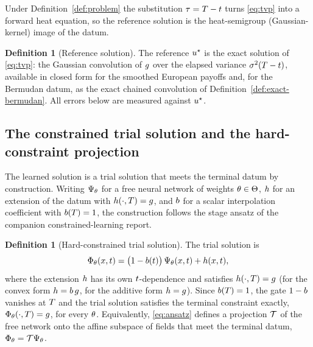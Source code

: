 \documentclass[11pt]{article}
\theoremstyle{plain}
\theoremstyle{definition}
\newtheorem{definition}[theorem]{Definition}
\theoremstyle{remark}
\begin{document}
Under Definition~\ref{def:problem} the substitution $\tau=T-t$
turns \eqref{eq:tvp} into a forward heat equation, so the reference solution is
the heat-semigroup (Gaussian-kernel) image of the datum.

\begin{definition}[Reference solution]\label{def:reference}
The reference $u^{\star}$ is the exact solution of \eqref{eq:tvp}:
the Gaussian convolution of $g$ over the elapsed variance
$\sigma^{2}(T-t)$, available in closed form for the smoothed
European payoffs and, for the Bermudan datum, as the exact chained convolution of
Definition~\ref{def:exact-bermudan}. All errors below are measured against
$u^{\star}$.
\end{definition}

\subsection{The constrained trial solution and the hard-constraint projection}\label{sec:ansatz}

The learned solution is a trial solution that meets the terminal datum by
construction. Writing $\Psi_{\theta}$ for a free neural network of
weights $\theta\in\Theta$, $h$ for an extension of the
datum with $h(\cdot,T)=g$, and
$b$ for a scalar interpolation coefficient with
$b(T)=1$, the construction follows the
stage ansatz of the companion constrained-learning report.

\begin{definition}[Hard-constrained trial solution]\label{def:ansatz}
The trial solution is
\begin{equation}\label{eq:ansatz}
  \Phi_{\theta}(x,t)
  =\bigl(1-b(t)\bigr)\,
     \Psi_{\theta}(x,t)
   +h(x,t),
\end{equation}
where the extension $h$ has its own $t$-dependence and
satisfies $h(\cdot,T)=g$ (for the convex form
$h=b\,g$, for the additive form
$h=g$).
Since $b(T)=1$, the gate $1-b$
vanishes at $T$ and the trial solution satisfies the terminal constraint
exactly, $\Phi_{\theta}(\cdot,T)=g$,
for every $\theta$. Equivalently, \eqref{eq:ansatz} defines a projection
$\mathcal{T}$ of the free network onto the affine subspace
of fields that meet the terminal datum, $\Phi_{\theta}=\mathcal{T}\Psi_{\theta}$.
\end{definition}
\end{document}
